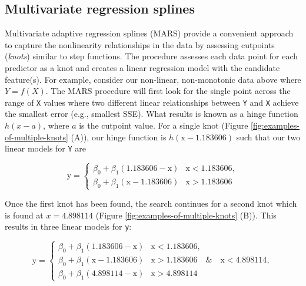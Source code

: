 \documentclass[]{krantz}
\begin{document}
\hypertarget{multivariate-regression-splines}{%
\subsection{Multivariate regression splines}\label{multivariate-regression-splines}}

Multivariate adaptive regression splines (MARS) provide a convenient approach to capture the nonlinearity relationships in the data by assessing cutpoints (\emph{knots}) similar to step functions. The procedure assesses each data point for each predictor as a knot and creates a linear regression model with the candidate feature(s). For example, consider our non-linear, non-monotonic data above where \(Y = f\left(X\right)\). The MARS procedure will first look for the single point across the range of \texttt{X} values where two different linear relationships between \texttt{Y} and \texttt{X} achieve the smallest error (e.g., smallest SSE). What results is known as a hinge function \(h\left(x-a\right)\), where \(a\) is the cutpoint value. For a single knot (Figure \ref{fig:examples-of-multiple-knots} (A)), our hinge function is \(h\left(\text{x}-1.183606\right)\) such that our two linear models for \texttt{Y} are

\begin{equation}
\label{eq:hinge}
  \text{y} = 
  \begin{cases}
    \beta_0 + \beta_1(1.183606 - \text{x}) & \text{x} < 1.183606, \\
    \beta_0 + \beta_1(\text{x} - 1.183606) & \text{x} > 1.183606
  \end{cases}
\end{equation}

Once the first knot has been found, the search continues for a second knot which is found at \(x = 4.898114\) (Figure \ref{fig:examples-of-multiple-knots} (B)). This results in three linear models for \texttt{y}:

\begin{equation}
\label{eq:hinge2}
  \text{y} = 
  \begin{cases}
    \beta_0 + \beta_1(1.183606 - \text{x}) & \text{x} < 1.183606, \\
    \beta_0 + \beta_1(\text{x} - 1.183606) & \text{x} > 1.183606 \quad \& \quad \text{x} < 4.898114, \\
    \beta_0 + \beta_1(4.898114 - \text{x}) & \text{x} > 4.898114
  \end{cases}
\end{equation}
\end{document}
